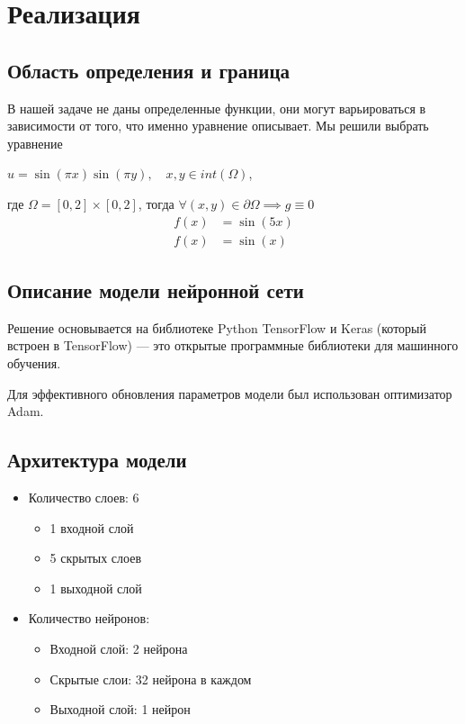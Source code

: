 \section{Реализация}
\subsection{Область определения и граница}
В нашей задаче не даны определенные функции, они могут варьироваться в зависимости от того, что именно уравнение описывает. Мы решили выбрать уравнение
\begin{center}
$u = \sin(\pi x) \sin(\pi y), \quad x, y \in int(\Omega)$,
\end{center}
\par
где $\Omega = [0, 2] \times [0, 2]$, тогда $\forall (x, y) \in \partial \Omega \implies g \equiv 0$ \\

\begin{align}
f(x) &= \sin(5x) \\
f(x) &= \sin(x)
\end{align}

\subsection{Описание модели нейронной сети}
Решение основывается на библиотеке \textrm{Python TensorFlow и Keras} (который встроен в \textrm{TensorFlow}) --- это открытые программные библиотеки для машинного обучения.

Для эффективного обновления параметров модели был использован оптимизатор Adam.

\subsection{Архитектура модели}

\begin{itemize}
    \item Количество слоев: 6
    \begin{itemize}
        \item 1 входной слой
        \item 5 скрытых слоев
        \item 1 выходной слой
    \end{itemize}
    \item Количество нейронов:
    \begin{itemize}
        \item Входной слой: 2 нейрона
        \item Скрытые слои: 32 нейрона в каждом
        \item Выходной слой: 1 нейрон
    \end{itemize}
\end{itemize}

